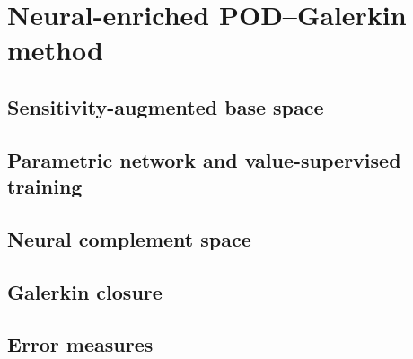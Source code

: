 \section{Neural-enriched POD--Galerkin method}
\label{sec:method}

\subsection{Sensitivity-augmented base space}
\label{sec:base}

\subsection{Parametric network and value-supervised training}
\label{sec:network}

\subsection{Neural complement space}
\label{sec:complement}

\subsection{Galerkin closure}
\label{sec:closure}

\subsection{Error measures}
\label{sec:errors}

